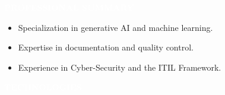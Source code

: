 \documentclass[9pt]{src/developercv} %
\begin{document}

	\vspace{-\baselineskip} %
	\colorbox{sky950}{\textcolor{white}{\LARGE\MakeUppercase{\textbf{Professional Summary}}}}\\%

	\begin{minipage}[t]{0.3\textwidth} 
			\begin{itemize}
					\item Specialization in generative AI and machine learning.
			\end{itemize}
	\end{minipage}
	\begin{minipage}[t]{0.3\textwidth} 
			\begin{itemize}
					\item Expertise in documentation and quality control.
			\end{itemize}
	\end{minipage}
	\begin{minipage}[t]{0.3\textwidth} 
			\begin{itemize}
					\item Experience in Cyber-Security and the ITIL Framework.
			\end{itemize}
	\end{minipage}

	\vspace{\baselineskip} %
	\colorbox{sky950}{\textcolor{white}{\LARGE\MakeUppercase{\textbf{Technologies}}}}\\%
\end{document}
